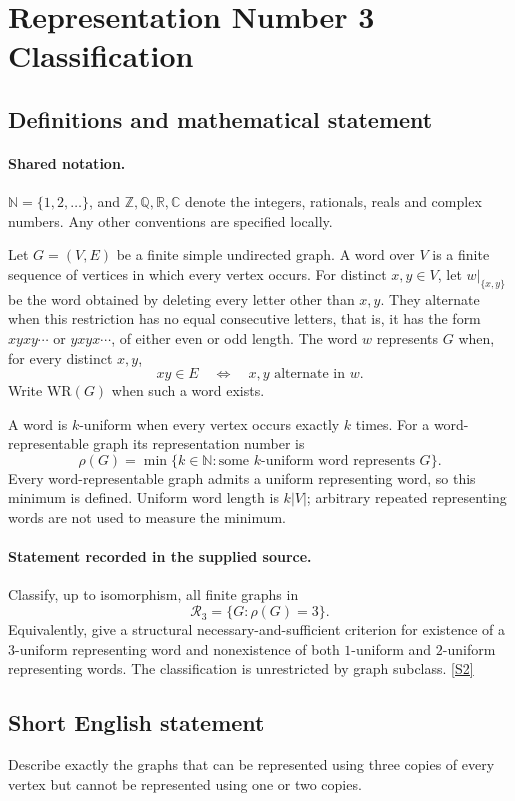 \documentclass[11pt]{article}
\newcommand{\sref}[2]{\hyperlink{source:#1:#2}{[S#2]}}
\begin{document}
\section{Representation Number 3 Classification}\label{statement}

\subsection{Definitions and mathematical statement}

\paragraph{Shared notation.}$\mathbb N=\{1,2,\ldots\}$, and $\mathbb Z,\mathbb Q,\mathbb R,\mathbb C$ denote the integers, rationals, reals and complex numbers. Any other conventions are specified locally.


Let $G=(V,E)$ be a finite simple undirected graph. A word over $V$ is a finite sequence of vertices in which every vertex occurs. For distinct $x,y\in V$, let $w|_{\{x,y\}}$ be the word obtained by deleting every letter other than $x,y$. They alternate when this restriction has no equal consecutive letters, that is, it has the form $xyxy\cdots$ or $yxyx\cdots$, of either even or odd length. The word $w$ represents $G$ when, for every distinct $x,y$,
\[
 xy\in E\quad\Longleftrightarrow\quad x,y\text{ alternate in }w.
\]
Write $\mathrm{WR}(G)$ when such a word exists.

A word is $k$-uniform when every vertex occurs exactly $k$ times. For a word-representable graph its representation number is
\[
 \rho(G)=\min\{k\in\mathbb N:\text{some }k\text{-uniform word represents }G\}.
\]
Every word-representable graph admits a uniform representing word, so this minimum is defined. Uniform word length is $k|V|$; arbitrary repeated representing words are not used to measure the minimum.


\paragraph{Statement recorded in the supplied source.}
Classify, up to isomorphism, all finite graphs in
\[
 \mathcal R_3=\{G:\rho(G)=3\}.
\]
Equivalently, give a structural necessary-and-sufficient criterion for existence of a $3$-uniform representing word and nonexistence of both $1$-uniform and $2$-uniform representing words. The classification is unrestricted by graph subclass. \sref{statement}{2}
\subsection{Short English statement}
Describe exactly the graphs that can be represented using three copies of every vertex but cannot be represented using one or two copies.
\end{document}
